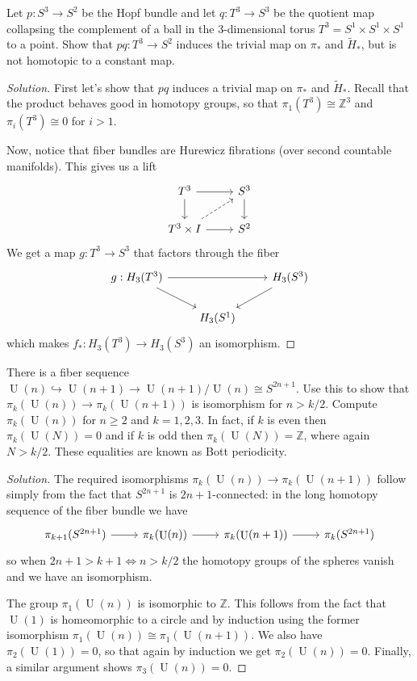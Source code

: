 \documentclass{article}
\numberwithin{equation}{section}
\newcommand{\Z}{\mathbb{Z}}
\DeclareMathOperator{\U}{U}
\begin{document}
\begin{exercise}[4.2.34]
	Let $p:S^3\to S^2$ be the Hopf bundle and let $q:T^3\to S^3$ be the quotient map collapsing the complement of a ball in the 3-dimensional torus $T^3=S^1\times S^1\times S^1$ to a point. Show that $pq:T^3\to S^2$ induces the trivial map on {\color{magenta}$\pi_*$} and {\color{magenta}$\widetilde{H}_*$}, but is not homotopic to a constant map.
\end{exercise}
\begin{proof}[Solution]
	First let's show that $pq$ induces a trivial map on $\pi_*$ and $\widetilde{H}_*$. Recall that the product behaves good in homotopy groups, so that $\pi_{1}(T^3)\cong \Z^3$ and $\pi_{i}(T^3)\cong 0$ for $i>1$.

	Now, notice that fiber bundles are Hurewicz fibrations (over second countable manifolds). This gives us a lift
	\[\begin{tikzcd}
		T^3\arrow[r]\arrow[d]&S^3\arrow[d]\\
		T^3\times I\arrow[ur,dashed]\arrow[r]&S^2
	\end{tikzcd}\]
	We get a map $g:T^3\to S^3$ that factors through the fiber
\[\begin{tikzcd}
	g:H_3(T^3)\arrow[rr]\arrow[dr]&&H_3(S^3)\arrow[dl]\\
	&H_3(S^1)
\end{tikzcd}\]
which makes $f_*:H_3(T^3)\to H_3(S^3)$ an isomorphism.

\end{proof}


\begin{exercise}
	There is a fiber sequence $\U(n)\hookrightarrow\U(n+1)\to\U(n+1)/\U(n)\cong S^{2n+1}$. Use this to show that $\pi_k(\U(n))\to\pi_k(\U(n+1))$ is isomorphism for $n>k/2$. Compute $\pi_k(\U(n))$ for $n\geq 2$ and $k=1,2,3$. In fact, if $k$ is even then $\pi_k(\U(N))=0$ and if $k$ is odd then $\pi_k(\U(N))=\Z$, where again $N>k/2$. These equalities are known as Bott periodicity.
\end{exercise}
\begin{proof}[Solution]
	The required isomorphisms $\pi_k(\U(n))\to\pi_k(\U(n+1))$ follow simply from the fact that $S^{2n+1}$ is $2n+1$-connected: in the long homotopy sequence of the fiber bundle we have
	\[\begin{tikzcd}
		\pi_{k+1}(S^{2n+1})\arrow[r]&\pi_k(\U(n))\arrow[r]&\pi_k(\U(n+1))\arrow[r]&\pi_k(S^{2n+1})
	\end{tikzcd}\]
	so when $2n+1>k+1\iff n>k/2$ the homotopy groups of the spheres vanish and we have an isomorphism.
	
	The group $\pi_1(\U(n))$ is isomorphic to $\Z$. This follows from the fact that $\U(1)$ is homeomorphic to a circle and by induction using the former isomorphism $\pi_1(\U(n))\cong\pi_1(\U(n+1))$. We also have $\pi_2(\U(1))=0$, so that again by induction we get $\pi_2(\U(n))=0$. Finally, a similar argument shows $\pi_3(\U(n))=0$.
\end{proof}
\end{document}
